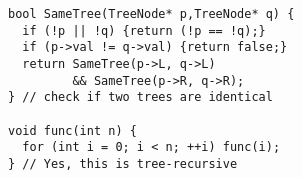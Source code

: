 \documentclass[6.6pt, twocolumn]{extarticle}
\renewcommand{\footnotesize}{\fontsize{5.25pt}{6.3pt}\selectfont}
\begin{document}
\begin{minipage}[c]{4.6cm}
\begin{tcolorbox}[top=-4pt,bottom=-4pt,left=-7.5pt,right=-1pt,center title,toptitle=-0.6mm,
  bottomtitle=-0.6mm,adjusted title={\footnotesize Linear Recursion (Non-Tail)},fonttitle=\large\sffamily\bfseries]
              \begin{lstlisting}[style = mystyle]

\end{lstlisting}
   \end{tcolorbox}

   \begin{tcolorbox}[top=-4pt,bottom=-4pt,left=-7.5pt,right=-1pt,center title,toptitle=-0.6mm,
  bottomtitle=-0.6mm,adjusted title={\footnotesize Tree Recursion},fonttitle=\large\sffamily\bfseries]
              \begin{lstlisting}[style = mystyle]
bool SameTree(TreeNode* p,TreeNode* q) {
  if (!p || !q) {return (!p == !q);}
  if (p->val != q->val) {return false;}
  return SameTree(p->L, q->L) 
         && SameTree(p->R, q->R);
} // check if two trees are identical

void func(int n) {
  for (int i = 0; i < n; ++i) func(i);
} // Yes, this is tree-recursive

\end{lstlisting}
   \end{tcolorbox}
\end{minipage}


\end{document}
